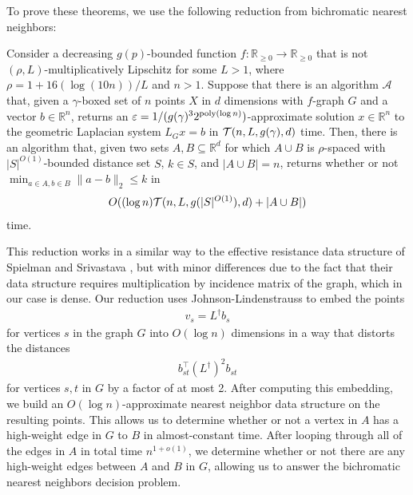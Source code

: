 To prove these theorems, we use the following reduction from bichromatic nearest neighbors:

\begin{lemma}\label{lem:lsolve-reduc}
Consider a decreasing $g(p)$-bounded function $f:\mathbb{R}_{\ge 0}\rightarrow \mathbb{R}_{\ge 0}$ that is not $(\rho,L)$-multiplicatively Lipschitz for some $L > 1$, where $\rho = 1 + 16(\log (10 n ))/L$ and $n > 1$. Suppose that there is an algorithm $\mathcal A$ that, given a $\gamma$-boxed set of $n$ points $X$ in $d$ dimensions with $f$-graph $G$ and a vector $b\in \mathbb{R}^n$, returns an $\varepsilon = 1/(g(\gamma)^3 2^{\mathrm{poly}(\log n)})$-approximate solution $x\in \mathbb{R}^n$ to the geometric Laplacian system $L_G x = b$ in $\mathcal{T}(n,L,g(\gamma),d)$ time. Then, there is an algorithm that, given two sets $A,B\subseteq \mathbb{R}^d$ for which $A\cup B$ is $\rho$-spaced with $|S|^{O(1)}$-bounded distance set $S$, $k\in S$, and $|A\cup B| = n$, returns whether or not $\min_{a\in A, b\in B} \|a - b\|_2 \le k$ in 
\begin{align*}
    O((\log n)\mathcal{T}(n,L,g(|S|^{O(1)}),d) + |A\cup B|)
\end{align*} 
time.
\end{lemma}

This reduction works in a similar way to the effective resistance data structure of Spielman and Srivastava \cite{ss11}, but with minor differences due to the fact that their data structure requires multiplication by incidence matrix of the graph, which in our case is dense. Our reduction uses Johnson-Lindenstrauss to embed the points
\begin{align*}
v_s = L^{\dagger} b_s
\end{align*}
for vertices $s$ in the graph $G$ into $O(\log n)$ dimensions in a way that distorts the distances
\begin{align*}
b_{st}^\top (L^{\dagger})^2 b_{st}
\end{align*}
for vertices $s,t$ in $G$ by a factor of at most 2. After computing this embedding, we build an $O(\log n)$-approximate nearest neighbor data structure on the resulting points. This allows us to determine whether or not a vertex in $A$ has a high-weight edge in $G$ to $B$ in almost-constant time. After looping through all of the edges in $A$ in total time $n^{1 + o(1)}$, we determine whether or not there are any high-weight edges between $A$ and $B$ in $G$, allowing us to answer the bichromatic nearest neighbors decision problem.

